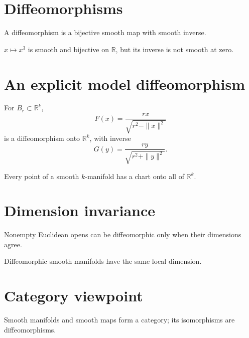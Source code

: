 \section{Diffeomorphisms}
\begin{definition}[Diffeomorphism]\label{def:vii03-diffeomorphism}
A diffeomorphism is a bijective smooth map with smooth inverse.
\end{definition}
\begin{warning}\label{warning:vii03-bijection}
\(x\mapsto x^3\) is smooth and bijective on \(\mathbb R\), but its inverse is not smooth at zero.
\end{warning}

\section{An explicit model diffeomorphism}
\begin{theorem}\label{thm:vii03-ball}
For \(B_r\subset\mathbb R^k\),
\[
F(x)=\frac{rx}{\sqrt{r^2-\|x\|^2}}
\]
is a diffeomorphism onto \(\mathbb R^k\), with inverse
\[
G(y)=\frac{ry}{\sqrt{r^2+\|y\|^2}}.
\]
\end{theorem}
\begin{corollary}\label{cor:vii03-full-space}
Every point of a smooth \(k\)-manifold has a chart onto all of \(\mathbb R^k\).
\end{corollary}

\section{Dimension invariance}
\begin{theorem}\label{thm:vii03-dimension}
Nonempty Euclidean opens can be diffeomorphic only when their dimensions agree.
\end{theorem}
\begin{corollary}\label{cor:vii03-manifold-dimension}
Diffeomorphic smooth manifolds have the same local dimension.
\end{corollary}

\section{Category viewpoint}
\begin{remark}\label{rem:vii03-category}
Smooth manifolds and smooth maps form a category; its isomorphisms are diffeomorphisms.
\end{remark}

